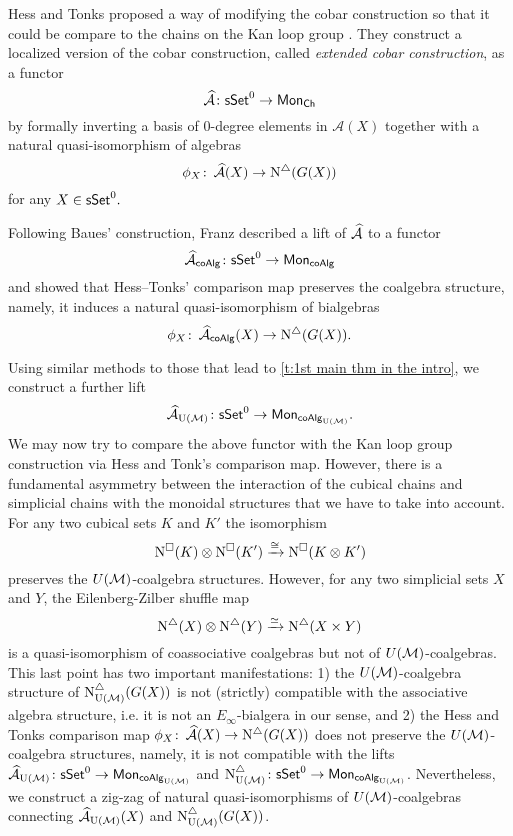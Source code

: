 Hess and Tonks proposed a way of modifying the cobar construction so that it could be compare to the chains on the Kan loop group \cite{hess2010cobar}. They construct a localized version of the cobar construction, called \textit{extended cobar construction}, as a functor
$$\operatorname{\mathcal{\widehat{A}}} \colon \mathsf{sSet}^0 \to \mathsf{Mon}_{\mathsf{Ch}}$$
by formally inverting a basis of $0$-degree elements in $\mathcal{A}(X)$ together with a natural quasi-isomorphism of algebras
\begin{equation*}
\phi_X \colon \operatorname{\mathcal{\widehat{A}}}(X) \to \operatorname{N^{\triangle}}(G(X))
\end{equation*}
for any $X \in \mathsf{sSet}^0.$

Following Baues’ construction, Franz described a lift of $\operatorname{\mathcal{\widehat{A}}}$ to a functor
\begin{equation*}
\operatorname{\mathcal{\widehat{A}}}_{\mathsf{coAlg}} \colon \mathsf{sSet}^0 \to \mathsf{Mon}_{\mathsf{coAlg}}
\end{equation*}
and showed that Hess--Tonks' comparison map preserves the coalgebra structure, namely, it induces a natural quasi-isomorphism of bialgebras
\begin{equation*}
\phi_X \colon \operatorname{\mathcal{\widehat{A}}}_{\mathsf{coAlg}}(X) \to \operatorname{N^{\triangle}} (G(X)).
\end{equation*}

Using similar methods to those that lead to \cref{t:1st main thm in the intro}, we construct a further lift
\begin{equation*}
\operatorname{\mathcal{\widehat{A}}}_{\mathrm{U}(\mathcal{M})} \colon \mathsf{sSet}^0 \to \mathsf{Mon}_{\mathsf{coAlg}_{\mathrm{U}(\mathcal{M})}}.
\end{equation*}
We may now try to compare the above functor with the Kan loop group construction via Hess and Tonk's comparison map. However, there is a fundamental asymmetry between the interaction of the cubical chains and simplicial chains with the monoidal structures that we have to take into account. For any two cubical sets $K$ and $K'$ the isomorphism $$\operatorname{N^{\square}}(K) \otimes \operatorname{N^{\square}}(K') \xrightarrow{\cong} \operatorname{N^{\square}}(K \otimes K')$$ preserves the $U(\mathcal{M})$-coalgebra structures. However, for any two simplicial sets $X$ and $Y$, the Eilenberg-Zilber shuffle map $$\operatorname{N^{\triangle}}(X) \otimes \operatorname{N^{\triangle}}(Y) \xrightarrow{\simeq} \operatorname{N^{\triangle}}(X \times Y)$$ is a quasi-isomorphism of coassociative coalgebras but not of $U(\mathcal{M})$-coalgebras. This last point has two important manifestations: 1) the $U(\mathcal{M})$-coalgebra structure of $\operatorname{N^{\triangle}_{{\mathrm{U}(\mathcal{M})}}}(G(X))$ is not (strictly) compatible with the associative algebra structure, i.e. it is not an $E_{\infty}$-bialgera in our sense, and 2) the Hess and Tonks comparison map $\phi_X \colon \operatorname{\mathcal{\widehat{A}}}(X) \to \operatorname{N^{\triangle}}(G(X))$ does not preserve the $U(\mathcal{M})$-coalgebra structures, namely, it is not compatible with the lifts $\operatorname{\mathcal{\widehat{A}}}_{\mathrm{U}(\mathcal{M})} \colon \mathsf{sSet}^0 \to \mathsf{Mon}_{\mathsf{coAlg}_{\mathrm{U}(\mathcal{M})}}$
and $\operatorname{N^{\triangle}_{{\mathrm{U}(\mathcal{M})}}} \colon \mathsf{sSet}^0 \to \mathsf{Mon}_{\mathsf{coAlg}_{\mathrm{U}(\mathcal{M})}}$. Nevertheless, we construct a zig-zag of natural quasi-isomorphisms of $U(\mathcal{M})$-coalgebras connecting $\operatorname{\mathcal{\widehat{A}}}_{\mathrm{U}(\mathcal{M})} (X)$ and $\operatorname{N^{\triangle}_{{\mathrm{U}(\mathcal{M})}}}(G(X))$. 

